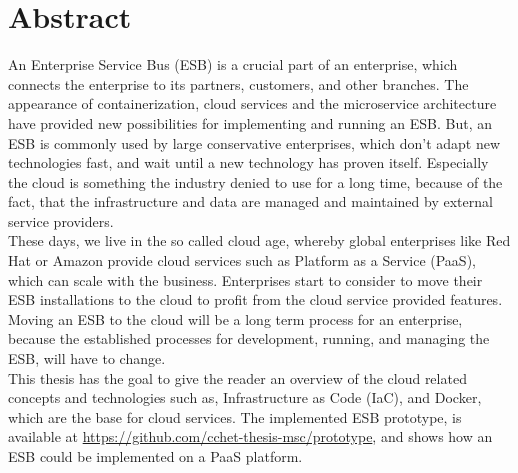 \chapter{Abstract}
An Enterprise Service Bus (ESB) is a crucial part of an enterprise, which connects the enterprise to its partners, customers, and other branches. The appearance of containerization, cloud services and the microservice architecture have provided new possibilities for implementing and running an ESB. But, an ESB is commonly used by large conservative enterprises, which don't adapt new technologies fast, and wait until a new technology has proven itself. Especially the cloud is something the industry denied to use for a long time, because of the fact, that the infrastructure and data are managed and maintained by external service providers. \\ 

These days, we live in the so called cloud age, whereby global enterprises like Red Hat or Amazon provide cloud services such as Platform as a Service (PaaS), which can scale with the business. Enterprises start to consider to move their ESB installations to the cloud to profit from the cloud service provided features. Moving an ESB to the cloud will be a long term process for an enterprise, because the established processes for development, running, and managing the ESB, will have to change. \\

This thesis has the goal to give the reader an overview of the cloud related concepts and technologies such as, Infrastructure as Code (IaC), and Docker, which are the base for cloud services. The implemented ESB prototype,  is  available at \url{https://github.com/cchet-thesis-msc/prototype}, and shows how an ESB could be implemented on a PaaS platform. \\


